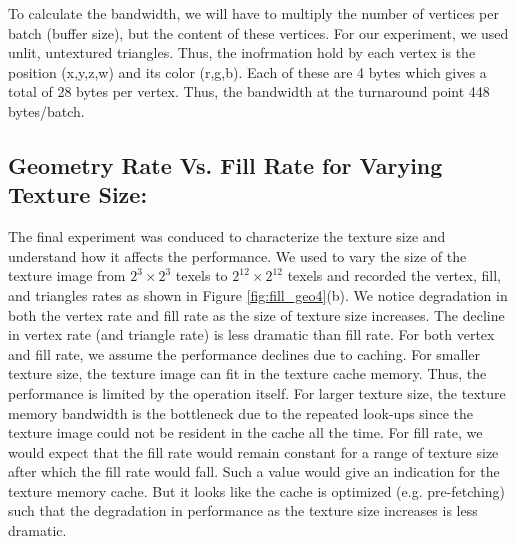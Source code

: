To calculate the bandwidth, we will have to multiply the number of vertices per batch (buffer size), but the content of these vertices. For our experiment, we used unlit, untextured triangles. Thus, the inofrmation hold by each vertex is the position (x,y,z,w) and its color (r,g,b). Each of these are 4 bytes which gives a total of 28 bytes per vertex. Thus, the bandwidth at the turnaround point 448 bytes/batch. 



\subsection{Geometry Rate Vs. Fill Rate for Varying Texture Size:}
The final experiment was conduced to characterize the texture size and understand how it affects the performance. We used \protect{\wes} to vary the size of the texture image from $2^{3}\times2^{3}$ texels to $2^{12}\times2^{12}$ texels and recorded the vertex, fill, and triangles rates as shown in Figure \ref{fig:fill_geo4}(b). We notice degradation in both the vertex rate and fill rate as the size of texture size increases. The decline in vertex rate (and triangle rate) is less dramatic than fill rate. For both vertex and fill rate, we assume the performance declines due to caching. For smaller texture size, the texture image can fit in the texture cache memory. Thus, the performance is limited by the operation itself. For larger texture size, the texture memory bandwidth is the bottleneck due to the repeated look-ups since the texture image could not be resident in the cache all the time. For fill rate, we would expect that the fill rate would remain constant for a range of texture size after which the fill rate would fall. Such a value would give an indication for the texture memory cache. But it looks like the cache is optimized (e.g. pre-fetching) such that the degradation in performance as the texture size increases is less dramatic. 

